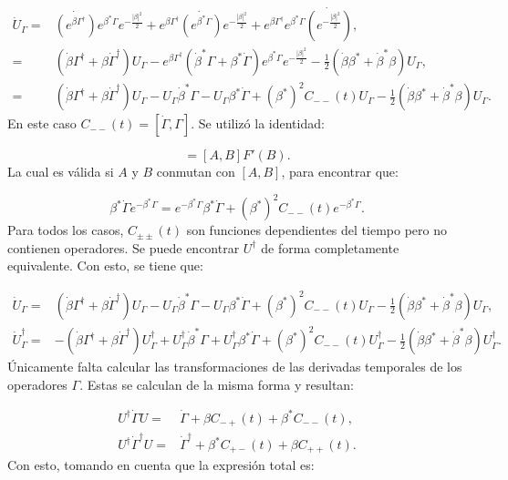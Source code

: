 \documentclass[a4paper,10pt]{report}
\begin{document}
\begin{align*}
\dot{U}_\Gamma =& \dot{(e^{\beta \Gamma^\dagger})}e^{\beta^* \Gamma}e^{-\frac{|\beta|^2}{2}}
+e^{\beta \Gamma^\dagger}\dot{(e^{\beta^* \Gamma})}e^{-\frac{|\beta|^2}{2}}+e^{\beta \Gamma^\dagger}e^{\beta^* \Gamma}\dot{(e^{-\frac{|\beta|^2}{2}})},\\
=&(\dot{\beta}\Gamma^\dagger +\beta \dot{\Gamma}^\dagger)U_\Gamma -e^{\beta \Gamma^\dagger}(\dot{\beta}^*\Gamma +\beta^* \dot{\Gamma})e^{\beta^* \Gamma}e^{-\frac{|\beta|^2}{2}} -\frac{1}{2}(\dot{\beta} \beta^*+\dot{\beta}^* \beta)U_\Gamma,\\
=&(\dot{\beta}\Gamma^\dagger +\beta \dot{\Gamma}^\dagger)U_\Gamma - U_\Gamma\dot{\beta}^*\Gamma-U_\Gamma\beta^* \dot{\Gamma} + (\beta^*)^2 C_{--}(t)U_\Gamma-\frac{1}{2}(\dot{\beta} \beta^*+\dot{\beta}^* \beta)U_\Gamma.
\end{align*} En este caso $C_{--}(t)=[\dot{\Gamma},\Gamma]$. Se utilizó la identidad:

\begin{equation}
[A,F(B)]=[A,B]F'(B).
\end{equation} La cual es válida si $A$ y $B$ conmutan con $[A,B]$, para encontrar que:

\begin{equation}
\beta^*\dot{\Gamma} e^{-\beta^* \Gamma} = e^{-\beta^* \Gamma}\beta^*\dot{\Gamma} + (\beta^*)^2 C_{--}(t) e^{-\beta^* \Gamma}.
\end{equation} Para todos los casos, $C_{\pm \pm}(t)$ son funciones dependientes del tiempo pero no contienen operadores. Se puede encontrar $U^\dagger$ de forma completamente equivalente. Con esto, se tiene que:

\begin{align}
\dot{U}_\Gamma =&(\dot{\beta}\Gamma^\dagger +\beta \dot{\Gamma}^\dagger)U_\Gamma - U_\Gamma\dot{\beta}^*\Gamma-U_\Gamma\beta^* \dot{\Gamma} + (\beta^*)^2 C_{--}(t)U_\Gamma-\frac{1}{2}(\dot{\beta} \beta^*+\dot{\beta}^* \beta)U_\Gamma, \\
\dot{U}^\dagger_\Gamma=&-(\dot{\beta}\Gamma^\dagger +\beta \dot{\Gamma}^\dagger)U_\Gamma^\dagger + U_\Gamma^\dagger\dot{\beta}^*\Gamma+U_\Gamma^\dagger\beta^* \dot{\Gamma} + (\beta^*)^2 C_{--}(t)U_\Gamma^\dagger-\frac{1}{2}(\dot{\beta} \beta^*+\dot{\beta}^* \beta)U_\Gamma^\dagger.
\end{align} Únicamente falta calcular las transformaciones de las derivadas temporales de los operadores $\Gamma$. Estas se calculan de la misma forma y resultan:

\begin{align}
U^{\dagger}\dot{\Gamma}U =& \dot{\Gamma} + \beta C_{-+}(t) +\beta^* C_{--}(t),\\
U^{\dagger}\dot{\Gamma}^\dagger U =& \dot{\Gamma}^\dagger + \beta^* C_{+-}(t) +\beta C_{++}(t). 
\end{align} Con esto, tomando en cuenta que la expresión total es:
\end{document}
